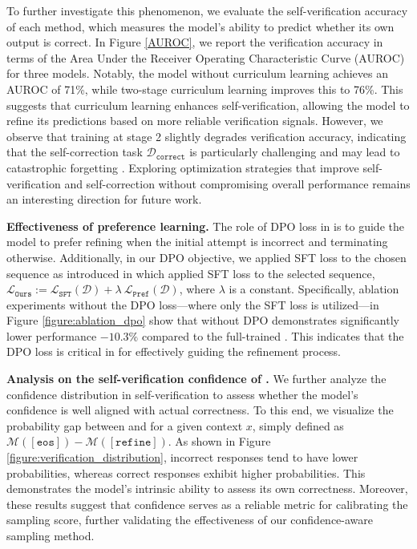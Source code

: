 To further investigate this phenomenon, we evaluate the self-verification accuracy of each method, which measures the model’s ability to predict whether its own output is correct. 
In Figure \ref{AUROC}, we report the verification accuracy in terms of the Area Under the Receiver Operating Characteristic Curve (AUROC) for three models. Notably, the model without curriculum learning achieves an AUROC of 71\%, while two-stage curriculum learning improves this to 76\%. 
This suggests that curriculum learning enhances self-verification, allowing the model to refine its predictions based on more reliable verification signals. 
However, we observe that training at stage 2 slightly degrades verification accuracy, indicating that the self-correction task $\mathcal{D}_{\mathtt{correct}}$ is particularly challenging and may lead to catastrophic forgetting \citep{mccloskey1989catastrophic}. 
Exploring optimization strategies that improve self-verification and self-correction without compromising overall performance remains an interesting direction for future work.



\textbf{Effectiveness of preference learning.} The role of DPO loss in \sname is to guide the model to prefer refining when the initial attempt is incorrect and terminating otherwise. Additionally, in our DPO objective, we applied SFT loss to the chosen sequence as introduced in \citet{liu2024rpoloss} which applied SFT loss to the selected sequence, $\mathcal{L}_{\mathtt{Ours}} := \mathcal{L}_{\mathtt{SFT}}(\mathcal{D}) + \lambda ~ \mathcal{L}_{\mathtt{Pref}}(\mathcal{D}) $, where $\lambda$ is a constant. 
Specifically, ablation experiments without the DPO loss—where only the SFT loss is utilized—in Figure \ref{figure:ablation_dpo} show that \sname without DPO demonstrates significantly lower performance $-10.3\%$ compared to the full-trained \sname. This indicates that the DPO loss is critical in \sname for effectively guiding the refinement process.



\textbf{Analysis on the self-verification confidence of \sname.} 
We further analyze the confidence distribution in self-verification to assess whether the model's confidence is well aligned with actual correctness. To this end, we visualize the probability gap between \eos and \rethink for a given context $x$, simply defined as $\mathcal{M}([\mathtt{eos}]) - \mathcal{M}([\mathtt{refine}])$. 
As shown in Figure \ref{figure:verification_distribution}, incorrect responses tend to have lower \eos probabilities, whereas correct responses exhibit higher \eos probabilities. This demonstrates the model’s intrinsic ability to assess its own correctness. Moreover, these results suggest that confidence serves as a reliable metric for calibrating the sampling score, further validating the effectiveness of our confidence-aware sampling method.



